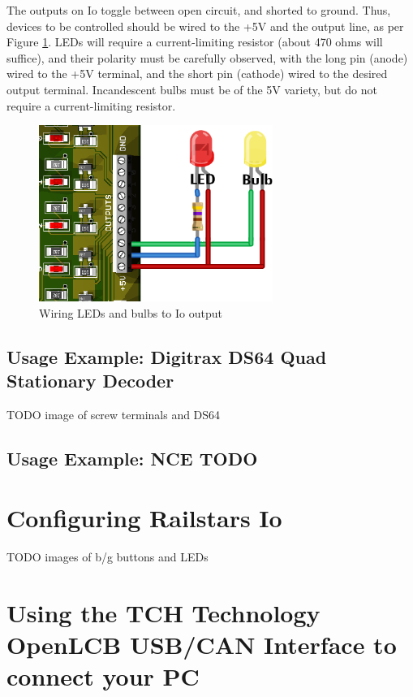 \documentclass[12pt]{book}
\begin{document}
The outputs on Io toggle between open circuit, and shorted to ground. Thus, devices to be controlled should be wired to the +5V and the output line, as per Figure \ref{indicators}. LEDs will require a current-limiting resistor (about 470 ohms will suffice), and their polarity must be carefully observed, with the long pin (anode) wired to the +5V terminal, and the short pin (cathode) wired to the desired output terminal. Incandescent bulbs must be of the 5V variety, but do not require a current-limiting resistor.

\begin{figure}[htbp]
\begin{center}
\includegraphics[width=3in]{images/Outputs-indicator.png}
\caption{Wiring LEDs and bulbs to Io output}
\label{indicators}
\end{center}
\end{figure}

\section{Usage Example: Digitrax DS64 Quad Stationary Decoder}

TODO image of screw terminals and DS64

\section{Usage Example: NCE TODO}

\chapter{Configuring Railstars Io}

TODO images of b/g buttons and LEDs

\chapter{Using the TCH Technology OpenLCB USB/CAN Interface to connect your PC}
\end{document}
